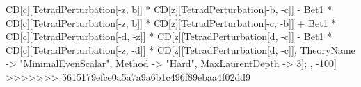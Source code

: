 CD[c][TetradPerturbation[-z, b]] * CD[z][TetradPerturbation[-b, -c]] - Bet1 * CD[c][TetradPerturbation[-z, b]] * CD[z][TetradPerturbation[-c, -b]] + Bet1 * CD[c][TetradPerturbation[-d, -z]] * CD[z][TetradPerturbation[d, -c]] - Bet1 * CD[c][TetradPerturbation[-z, -d]] * CD[z][TetradPerturbation[d, -c]], TheoryName -> "MinimalEvenScalar", Method -> "Hard", MaxLaurentDepth -> 3]; , -100]
>>>>>>> 5615179efce0a5a7a9a6b1c496f89ebaa4f02dd9
